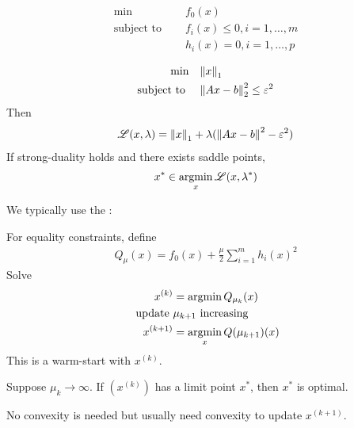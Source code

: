 \documentclass[class=article,crop=false]{standalone}
\begin{document}
\begin{align*}
\min\quad &f_0(x) \\
\text{subject to } \quad &f_i(x) \leq 0, i = 1,\ldots,m \\
&h_i(x) = 0 , i = 1,\ldots,p
\end{align*}
\begin{eg}
\begin{align*}
\min\quad &{\left\lVert{ x}\right\rVert}_1  \\
\text{subject to } \quad & {\left\lVert{ Ax-b}\right\rVert}_2 ^2 \leq \varepsilon^2 
\end{align*}
Then
\begin{align*}
	\mathscr{L}(x,\lambda) = {\left\lVert{ x}\right\rVert}_1 + \lambda ( {\left\lVert{ Ax-b}\right\rVert}^2 - \varepsilon^2 ) 
\end{align*}
If strong-duality holds and there exists saddle points,
\begin{align*}
	x^*  \in \operatorname*{argmin}_{x} \mathscr{L}(x, \lambda^* )
\end{align*}
\end{eg}
We typically use the :

For equality constraints, define
\begin{align*}
	Q_{\mu} (x) = f_0(x) + \frac{\mu}{2} \sum_{ i= 1}^{ m} h_i(x)^2
\end{align*}
Solve
\begin{align*}
	x^{(k)} &= \operatorname*{argmin} Q_{\mu_k}(x)\\
	\text{ update } &\mu_{k+1} \text{ increasing}\\
	x^{(k+1)} &= \operatorname*{argmin}_{x} Q(\mu_{k+1}) (x)
\end{align*}
This is a warm-start with $ x^{(k)}$.
\begin{thm}
	Suppose $ \mu_k \to \infty$. If $ (x^{(k)})$ has a limit point $ x^* $, then $ x^* $ is optimal.
\end{thm}
\begin{note}
	No convexity is needed but usually need convexity to update $ x^{(k+1)}$.
\end{note}
\end{document}
